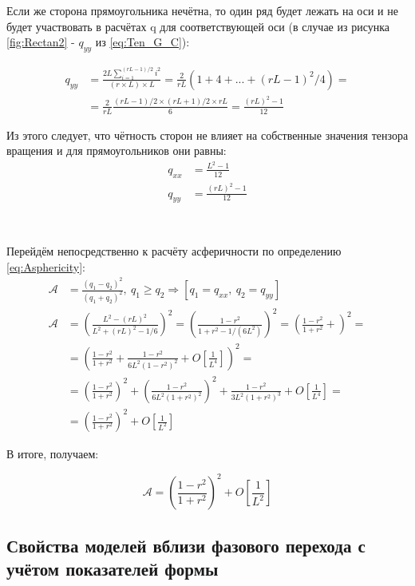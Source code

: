 Если же сторона прямоугольника нечётна, то один ряд будет лежать на оси и не будет участвовать в расчётах q для соответствующей оси (в случае из рисунка \ref{fig:Rectan2} - $q_{yy}$ из \eqref{eq:Ten_G_C}):

\begin{align*}
    q_{yy} &= \frac{2 L\sum_{i=1}^{(rL-1)/2}i^{2}}{(r \times L) \times L} = \frac{2}{r L} (1 + 4 + ... + (r L -1)^{2}/4) = \\
    &= \frac{2}{r L} \frac{(r L-1)/2 \times (r L+1)/2 \times r L}{6} = \frac{(r L)^{2} - 1}{12}
\end{align*}

Из этого следует, что чётность сторон не влияет на собственные значения тензора вращения и для прямоугольников они равны:
\begin{align}
    q_{xx} &= \frac{L^{2}-1}{12} \label{eq:Qx} \\
    q_{yy} &= \frac{(r L)^{2} - 1}{12}
    \label{eq:Qy}
\end{align}

\

Перейдём непосредственно к расчёту асферичности по определению \eqref{eq:Asphericity}: 
\begin{align*}
    \mathcal{A} &= \frac{(q_{1} - q_{2})^{2}}{(q_{1} + q_{2})^{2}},\ q_{1} \geqslant q_{2} \Rightarrow \left[ q_{1} = q_{xx},\ q_{2} = q_{yy} \right] \\
    \mathcal{A} &= \left(\frac{L^{2} - (rL)^{2}}{L^{2} + (rL)^{2} - 1/6}\right)^{2} = \left( \frac{1 - r^{2}}{1 + r^{2} - 1/(6L^{2})} \right)^{2} = \left( \frac{1-r^{2}}{1+r^{2}} +  \right)^{2} = \\
    &= \left( \frac{1-r^{2}}{1+r^{2}} + \frac{1-r^{2}}{6L^{2}(1-r^{2})^{2}} + O[\frac{1}{L^{4}}] \right)^{2} = \\
    &= \left( \frac{1-r^{2}}{1+r^{2}}\right)^{2} + \left( \frac{1-r^{2}}{6L^{2}(1+r^{2})^{2}} \right)^{2} + \frac{1-r^{2}}{3L^{2}(1+r^{2})^{3}} + O[\frac{1}{L^{4}}] = \\
    &= \left( \frac{1-r^{2}}{1+r^{2}}\right)^{2} + O[\frac{1}{L^{2}}]
\end{align*}

В итоге, получаем:

\begin{equation}
    \mathcal{A} = \left( \frac{1-r^{2}}{1+r^{2}}\right)^{2} + O[\frac{1}{L^{2}}]
    \label{eq:AsperScaled}
\end{equation}



\subsection{Свойства моделей вблизи фазового перехода с учётом показателей формы}


